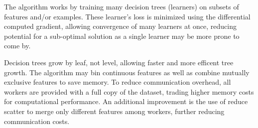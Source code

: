The algorithm works by training many decision trees (learners) on subsets of features and/or examples. These learner's loss is minimized using the differential computed gradient, allowing convergence of many learners at once, reducing potential for a sub-optimal solution as a single learner may be more prone to come by.

Decision trees grow by leaf, not level, allowing faster and more efficent tree growth. The algorithm may bin continuous features as well as combine mutually exclusive features to save memory. To reduce communication overhead, all workers are provided with a full copy of the dataset, trading higher memory costs for computational performance. An additional improvement is the use of reduce scatter to merge only different features among workers, further reducing communication costs.